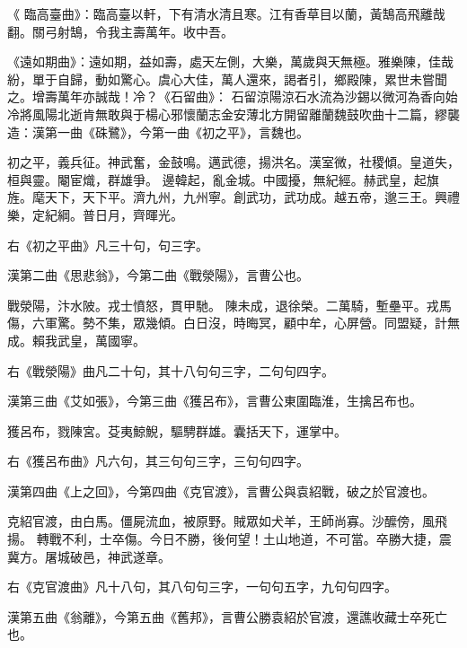 \begin{pinyinscope}
 《
 臨高臺曲》：臨高臺以軒，下有清水清且寒。江有香草目以蘭，黃鵠高飛離哉翻。關弓射鵠，令我主壽萬年。收中吾。



 《遠如期曲》：遠如期，益如壽，處天左側，大樂，萬歲與天無極。雅樂陳，佳哉紛，單于自歸，動如驚心。虞心大佳，萬人還來，謁者引，鄉殿陳，累世未嘗聞之。增壽萬年亦誠哉！冷？《石留曲》：
 石留涼陽涼石水流為沙錫以微河為香向始冷將風陽北逝肯無敢與于楊心邪懷蘭志金安薄北方開留離蘭魏鼓吹曲十二篇，繆襲造：漢第一曲《硃鷺》，今第一曲《初之平》，言魏也。



 初之平，義兵征。神武奮，金鼓鳴。邁武德，揚洪名。漢室微，社稷傾。皇道失，桓與靈。閹宦熾，群雄爭。
 邊韓起，亂金城。中國擾，無紀經。赫武皇，起旗旌。麾天下，天下平。濟九州，九州寧。創武功，武功成。越五帝，邈三王。興禮樂，定紀綱。普日月，齊暉光。



 右《初之平曲》凡三十句，句三字。



 漢第二曲《思悲翁》，今第二曲《戰滎陽》，言曹公也。



 戰滎陽，汴水陂。戎士憤怒，貫甲馳。
 陳未成，退徐榮。二萬騎，塹壘平。戎馬傷，六軍驚。勢不集，眾幾傾。白日沒，時晦冥，顧中牟，心屏營。同盟疑，計無成。賴我武皇，萬國寧。



 右《戰滎陽》曲凡二十句，其十八句句三字，二句句四字。



 漢第三曲《艾如張》，今第三曲《獲呂布》，言曹公東圍臨淮，生擒呂布也。



 獲呂布，戮陳宮。芟夷鯨鯢，驅騁群雄。囊括天下，運掌中。



 右《獲呂布曲》凡六句，其三句句三字，三句句四字。



 漢第四曲《上之回》，今第四曲《克官渡》，言曹公與袁紹戰，破之於官渡也。



 克紹官渡，由白馬。僵屍流血，被原野。賊眾如犬羊，王師尚寡。沙醿傍，風飛揚。
 轉戰不利，士卒傷。今日不勝，後何望！土山地道，不可當。卒勝大捷，震冀方。屠城破邑，神武遂章。



 右《克官渡曲》凡十八句，其八句句三字，一句句五字，九句句四字。



 漢第五曲《翁離》，今第五曲《舊邦》，言曹公勝袁紹於官渡，還譙收藏士卒死亡也。




\end{pinyinscope}
